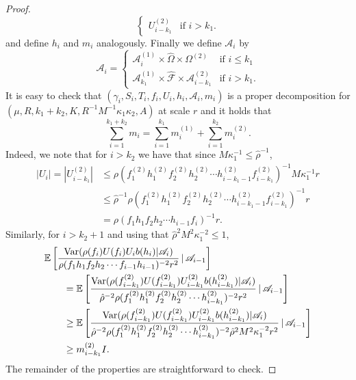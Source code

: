 \documentclass[10pt, english,oneside,reqno]{amsart}
\theoremstyle{plain}
\theoremstyle{remark}
\numberwithin{equation}{section}
\numberwithin{figure}{section}
\DeclareMathOperator{\var}{Var}
\newcommand{\E}{\mathbb{E}}
\begin{document}
\begin{proof}
\begin{equation*}
\begin{cases}
            U_{i-k_1}^{(2)} & \text{if } i > k_1.
        \end{cases}
    \end{equation*}
    and define $h_i$ and $m_i$ analogously. Finally we define $\mathscr{A}_i$ by
    \begin{equation*}
        \mathscr{A}_i =
        \begin{cases}
            \mathscr{A}_i^{(1)} \times \hat{\Omega} \times \Omega^{(2)} & \text{if } i \leq k_1\\
            \mathscr{A}_{k_1}^{(1)} \times \hat{\mathscr{F}} \times \mathscr{A}_{i-k_1}^{(2)} & \text{if } i > k_1.
        \end{cases}
    \end{equation*}
    It is easy to check that $\left(\gamma_i, S_i, T_i, f_i, U_i, h_i, \mathscr{A}_i, m_i\right)$ is a proper decomposition for $(\mu, R, k_1 + k_2, K, R^{-1} M^{-1} \kappa_1 \kappa_2, A)$ at scale $r$ and it holds that $$\sum_{i=1}^{k_1+k_2} m_i = \sum_{i=1}^{k_1} m_i^{(1)} + \sum_{i=1}^{k_2} m_i^{(2)}.$$ Indeed, we note that for $i > k_2$ we have that since $M\kappa_1^{-1} \leq \hat{\rho}^{-1}$,
    \begin{align*}
        |U_i| = |U_{i-k_1}^{(2)}| &\leq \rho(f_1^{(2)}h_1^{(2)}f_2^{(2)}h_2^{(2)}\cdots h_{i-k_1 -1}^{(2)} f_{i-k_1}^{(2)})^{-1} M\kappa_1^{-1}r \\
        &\leq \hat{\rho}^{-1}\rho(f_1^{(2)}h_1^{(2)}f_2^{(2)}h_2^{(2)}\cdots h_{i-k_1 -1}^{(2)} f_{i-k_1}^{(2)})^{-1} r \\
        &= \rho(f_1h_1f_2h_2\cdots h_{i-1} f_{i})^{-1}r.
    \end{align*}
    Similarly, for $i > k_2 + 1$ and using that $\hat{\rho}^2M^2\kappa_1^{-2} \leq 1$,
    \begin{align*}
        \MoveEqLeft \E\left[   \frac{\var(\rho(f_i) U(f_i) U_i b(h_i)|\mathscr{A}_i)}{\rho(f_1h_1 f_2h_2 \cdots f_{i-1}h_{i-1})^{-2} r^2} \,|\, \mathscr{A}_{i-1}  \right] \\
        &= \E\left[   \frac{\var(\rho(f^{(2)}_{i -k_1}) U(f^{(2)}_{i -k_1}) U^{(2)}_{i-k_1} b(h^{(2)}_{i - k_1})|\mathscr{A}_i)}{\hat{\rho}^{-2}\rho(f_1^{(2)}h_1^{(2)}f_2^{(2)}h_2^{(2)}\cdots h_{i-k_1}^{(2)})^{-2} r^2} \,|\, \mathscr{A}_{i-1}  \right] \\
        &\geq  \E\left[   \frac{\var(\rho(f^{(2)}_{i -k_1}) U(f^{(2)}_{i -k_1}) U^{(2)}_{i-k_1} b(h^{(2)}_{i - k_1})|\mathscr{A}_i)}{\hat{\rho}^{-2}\rho(f_1^{(2)}h_1^{(2)}f_2^{(2)}h_2^{(2)}\cdots h_{i-k_1}^{(2)})^{-2} \hat{\rho}^2 M^2 \kappa_1^{-2} r^2} \,|\, \mathscr{A}_{i-1}  \right] \\
        &\geq m_{i - k_1}^{(2)}I.
    \end{align*} The remainder of the properties are straightforward to check. 
\end{proof}
\end{document}
